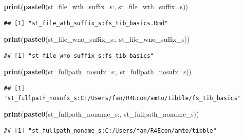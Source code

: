 \documentclass[
]{book}
\newenvironment{Shaded}{\begin{snugshade}}{\end{snugshade}}
\newcommand{\KeywordTok}[1]{\textcolor[rgb]{0.13,0.29,0.53}{\textbf{#1}}}
\newcommand{\NormalTok}[1]{#1}
\newcommand{\StringTok}[1]{\textcolor[rgb]{0.31,0.60,0.02}{#1}}
\begin{document}
\begin{Shaded}
\begin{Highlighting}[]
\KeywordTok{print}\NormalTok{(}\KeywordTok{paste0}\NormalTok{(}\StringTok{\textquotesingle{}st\_file\_wth\_suffix\_s:\textquotesingle{}}\NormalTok{, st\_file\_wth\_suffix\_s))}
\end{Highlighting}
\end{Shaded}

\begin{verbatim}
## [1] "st_file_wth_suffix_s:fs_tib_basics.Rmd"
\end{verbatim}

\begin{Shaded}
\begin{Highlighting}[]
\KeywordTok{print}\NormalTok{(}\KeywordTok{paste0}\NormalTok{(}\StringTok{\textquotesingle{}st\_file\_wno\_suffix\_s:\textquotesingle{}}\NormalTok{, st\_file\_wno\_suffix\_s))}
\end{Highlighting}
\end{Shaded}

\begin{verbatim}
## [1] "st_file_wno_suffix_s:fs_tib_basics"
\end{verbatim}

\begin{Shaded}
\begin{Highlighting}[]
\KeywordTok{print}\NormalTok{(}\KeywordTok{paste0}\NormalTok{(}\StringTok{\textquotesingle{}st\_fullpath\_nosufx\_s:\textquotesingle{}}\NormalTok{, st\_fullpath\_nosufx\_s))}
\end{Highlighting}
\end{Shaded}

\begin{verbatim}
## [1] "st_fullpath_nosufx_s:C:/Users/fan/R4Econ/amto/tibble/fs_tib_basics"
\end{verbatim}

\begin{Shaded}
\begin{Highlighting}[]
\KeywordTok{print}\NormalTok{(}\KeywordTok{paste0}\NormalTok{(}\StringTok{\textquotesingle{}st\_fullpath\_noname\_s:\textquotesingle{}}\NormalTok{, st\_fullpath\_noname\_s))}
\end{Highlighting}
\end{Shaded}

\begin{verbatim}
## [1] "st_fullpath_noname_s:C:/Users/fan/R4Econ/amto/tibble"
\end{verbatim}
\end{document}
